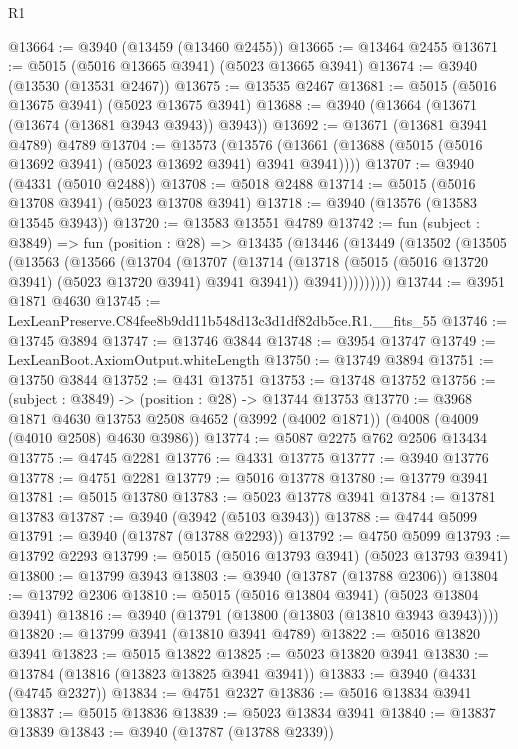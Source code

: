 \begin{lexlean}{R1}
\begin{coremodule}
@13664 := @3940 (@13459 (@13460 @2455))
@13665 := @13464 @2455
@13671 := @5015 (@5016 @13665 @3941) (@5023 @13665 @3941)
@13674 := @3940 (@13530 (@13531 @2467))
@13675 := @13535 @2467
@13681 := @5015 (@5016 @13675 @3941) (@5023 @13675 @3941)
@13688 := @3940 (@13664 (@13671 (@13674 (@13681 @3943 @3943)) @3943))
@13692 := @13671 (@13681 @3941 @4789) @4789
@13704 := @13573
    (@13576 (@13661 (@13688 (@5015 (@5016 @13692 @3941) (@5023 @13692 @3941) @3941 @3941))))
@13707 := @3940 (@4331 (@5010 @2488))
@13708 := @5018 @2488
@13714 := @5015 (@5016 @13708 @3941) (@5023 @13708 @3941)
@13718 := @3940 (@13576 (@13583 @13545 @3943))
@13720 := @13583 @13551 @4789
@13742 := fun (subject : @3849) =>
  fun (position : @28) =>
  @13435
    (@13446
      (@13449
        (@13502
          (@13505
            (@13563
              (@13566
                (@13704
                  (@13707
                    (@13714
                      (@13718 (@5015 (@5016 @13720 @3941) (@5023 @13720 @3941) @3941 @3941))
                      @3941)))))))))
@13744 := @3951 @1871 @4630
@13745 := LexLeanPreserve.C84fee8b9dd11b548d13c3d1df82db5ce.R1.__fits_55
@13746 := @13745 @3894
@13747 := @13746 @3844
@13748 := @3954 @13747
@13749 := LexLeanBoot.AxiomOutput.whiteLength
@13750 := @13749 @3894
@13751 := @13750 @3844
@13752 := @431 @13751
@13753 := @13748 @13752
@13756 := (subject : @3849) -> (position : @28) -> @13744 @13753
@13770 := @3968
    @1871
    @4630
    @13753
    @2508
    @4652
    (@3992 (@4002 @1871))
    (@4008 (@4009 (@4010 @2508) @4630 @3986))
@13774 := @5087 @2275 @762 @2506 @13434
@13775 := @4745 @2281
@13776 := @4331 @13775
@13777 := @3940 @13776
@13778 := @4751 @2281
@13779 := @5016 @13778
@13780 := @13779 @3941
@13781 := @5015 @13780
@13783 := @5023 @13778 @3941
@13784 := @13781 @13783
@13787 := @3940 (@3942 (@5103 @3943))
@13788 := @4744 @5099
@13791 := @3940 (@13787 (@13788 @2293))
@13792 := @4750 @5099
@13793 := @13792 @2293
@13799 := @5015 (@5016 @13793 @3941) (@5023 @13793 @3941)
@13800 := @13799 @3943
@13803 := @3940 (@13787 (@13788 @2306))
@13804 := @13792 @2306
@13810 := @5015 (@5016 @13804 @3941) (@5023 @13804 @3941)
@13816 := @3940 (@13791 (@13800 (@13803 (@13810 @3943 @3943))))
@13820 := @13799 @3941 (@13810 @3941 @4789)
@13822 := @5016 @13820 @3941
@13823 := @5015 @13822
@13825 := @5023 @13820 @3941
@13830 := @13784 (@13816 (@13823 @13825 @3941 @3941))
@13833 := @3940 (@4331 (@4745 @2327))
@13834 := @4751 @2327
@13836 := @5016 @13834 @3941
@13837 := @5015 @13836
@13839 := @5023 @13834 @3941
@13840 := @13837 @13839
@13843 := @3940 (@13787 (@13788 @2339))

\end{coremodule}
\end{lexlean}

